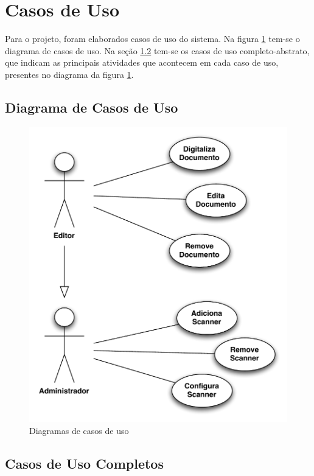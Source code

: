 
\section{Casos de Uso}
\label{sec:casos_de_uso}

Para o projeto, foram elaborados casos de uso do sistema. Na figura \ref{fig:casos_de_uso}
tem-se o diagrama de casos de uso. Na seção \ref{sec:casos_completos} tem-se os casos de uso
completo-abstrato, que indicam as principais atividades que acontecem em cada caso de uso, presentes no diagrama da figura \ref{fig:casos_de_uso}.

\subsection{Diagrama de Casos de Uso}
\begin{figure}[ht]
 \centering
  \includegraphics[scale=0.7]{img/use-case-diagram.pdf}
  \caption {Diagramas de casos de uso}
  \label{fig:casos_de_uso}
\end{figure}

\subsection{Casos de Uso Completos}
\label{sec:casos_completos}

